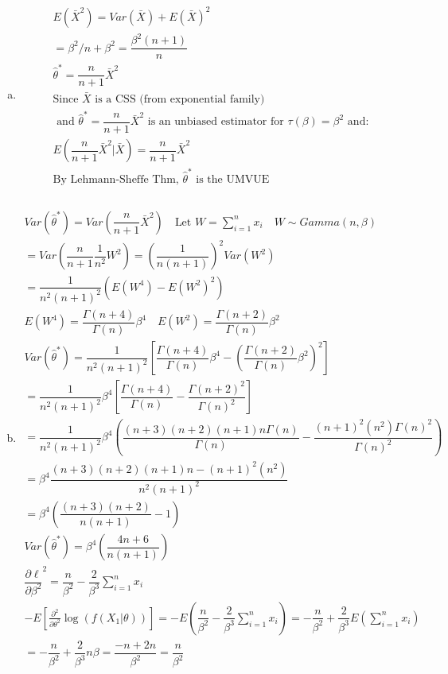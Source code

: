 \documentclass{article}
\newcommand{\pderiv}[2]{\frac{\partial #1}{\partial #2}}
\newcommand{\B}{\beta}
\newcommand{\hth}{\hat{\theta}}
\newcommand{\dll}[1]{\dfrac{\partial\ell}{\partial{#1}}}
\newcommand{\sumx}{\sum_{i=1}^{n}x_i}
\newcommand{\ta}{\theta}
\newcommand{\lt}[1]{\log(f(#1|\ta))}
\begin{document}
\begin{flushleft}
\begin{enumerate}[(a)]
	\item 
\begin{multline*}\\
E(\bar{X}^2)=Var(\bar{X})+E(\bar{X})^2\\
=\B^2/n+\B^2=\dfrac{\B^2(n+1)}{n}\\
\hth^*=\dfrac{n}{n+1}\bar{X}^2\\
\text{Since } \bar{X} \text{ is a CSS (from exponential family)} \\
\text{ and } \hth^*=\dfrac{n}{n+1}\bar{X}^2 \text{ is an unbiased estimator for } \tau(\B)=\B^2 \text{ and:}\\
E\left(\dfrac{n}{n+1}\bar{X}^2|\bar{X}\right)=\dfrac{n}{n+1}\bar{X}^2\\
\text{By Lehmann-Sheffe Thm, } \hth^* \text{ is the UMVUE}\\
\end{multline*}
\pagebreak
	\item 
\begin{multline*}\\
Var(\hth^*)=Var\left(\dfrac{n}{n+1}\bar{X}^2\right) \quad \text{Let } W=\sumx \quad W\sim Gamma(n,\B)\\
=Var\left(\dfrac{n}{n+1}\dfrac{1}{n^2}W^2\right)
=\left(\dfrac{1}{n(n+1)}\right)^2Var(W^2)\\
=\dfrac{1}{n^2(n+1)^2}(E(W^4)-E(W^2)^2)\\
E(W^4)=\dfrac{\Gamma(n+4)}{\Gamma(n)}\B^4\quad E(W^2)=\dfrac{\Gamma(n+2)}{\Gamma(n)}\B^2\\
Var(\hth^*)=\dfrac{1}{n^2(n+1)^2}\left[\dfrac{\Gamma(n+4)}{\Gamma(n)}\B^4-\left(\dfrac{\Gamma(n+2)}{\Gamma(n)}\B^2\right)^2 \right]\\
=\dfrac{1}{n^2(n+1)^2}\B^4\left[\dfrac{\Gamma(n+4)}{\Gamma(n)}-\dfrac{\Gamma(n+2)^2}{\Gamma(n)^2} \right]\\
=\dfrac{1}{n^2(n+1)^2}\B^4\left(\dfrac{(n+3)(n+2)(n+1)n\Gamma(n)}{\Gamma(n)}-\dfrac{(n+1)^2(n^2)\Gamma(n)^2}{\Gamma(n)^2}\right)\\
=\B^4\dfrac{(n+3)(n+2)(n+1)n-(n+1)^2(n^2)}{n^2(n+1)^2}\\
=\B^4\left(\dfrac{(n+3)(n+2)}{n(n+1)}-1\right)\\
Var(\hth^*)=\B^4\left(\dfrac{4n+6}{n(n+1)}\right)\\
\dll{\B^2}^2=\dfrac{n}{\B^2}-\dfrac{2}{\B^3}\sumx\\
-E[\pderiv{^2}{\ta^2}\lt{X_1}]=-E\left(\dfrac{n}{\B^2}-\dfrac{2}{\B^3}\sumx\right)=-\dfrac{n}{\B^2}+\dfrac{2}{\B^3}E\left(\sumx\right)\\
=-\dfrac{n}{\B^2}+\dfrac{2}{\B^3}n\B=\dfrac{-n+2n}{\B^2}=\dfrac{n}{\B^2}\\

\end{multline*}
\end{enumerate}
\end{flushleft}
\end{document}
